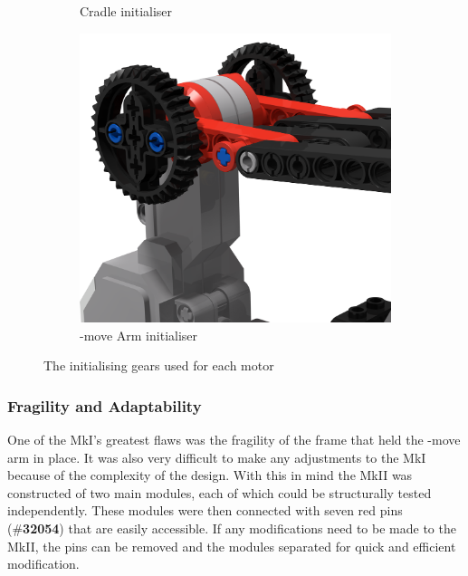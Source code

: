 \documentclass{report}
\newcommand{\tbo}[1]{\textbf{#1}}
\newcommand{\legopiece}[1]{(\#\tbo{#1})}
\newcommand{\move}[1]{\uppercase{\texttt{\formatmovesnospace{#1}}}-move}
\begin{document}
\begin{figure}[H]
\begin{subfigure}[b]{0.25\textwidth}
			\caption{Cradle initialiser}
			\label{fig:rdrInitialiser2}
		\end{subfigure}
		\hspace{10mm}
		\begin{subfigure}[b]{0.25\textwidth}
			\includegraphics[width=\textwidth]{Resources/Images/rdrInitialiser3.png}
			\caption{\move{x} Arm initialiser}
			\label{fig:rdrInitialiser3}
		\end{subfigure}
		\caption{The initialising gears used for each motor}
		\label{fig:rdrInitialiser}
	\end{figure}
	
	\subsubsection{Fragility and Adaptability}
	
	One of the MkI's greatest flaws was the fragility of the frame that held the \move{x} arm in place. It was also very difficult to make any adjustments to the MkI because of the complexity of the design. With this in mind the MkII was constructed of two main modules, each of which could be structurally tested independently. These modules were then connected with seven red pins \legopiece{32054} that are easily accessible. If any modifications need to be made to the MkII, the pins can be removed and the modules separated for quick and efficient modification.
	
\end{document}
